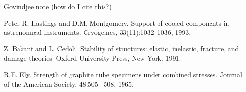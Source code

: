 \documentclass[final]{svjour2}
\begin{document}
\begin{thebibliography}{99}

Govindjee note (how do I cite this?)

Peter R. Hastings and D.M. Montgomery. Support of cooled components in astronomical instruments. Cryogenics, 33(11):1032–1036, 1993.

Z. Ba$\check{z}$ant and L. Cedoli. Stability of structures: elastic, inelastic, fracture, and damage theories. Oxford University Press, New York, 1991.

R.E. Ely. Strength of graphite tube specimens under combined stresses. Journal of the American Society, 48:505– 508, 1965.

\end{thebibliography}
\end{document}
